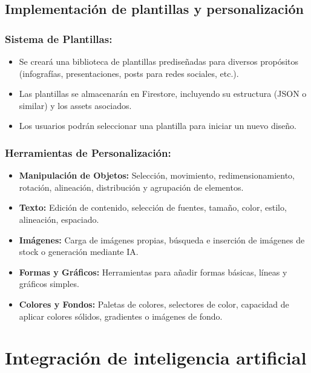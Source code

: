 \documentclass[12pt,a4paper]{report}
\begin{document}
\subsection{Implementación de plantillas y personalización}

\subsubsection{Sistema de Plantillas:}

\begin{itemize}
\item Se creará una biblioteca de plantillas prediseñadas para diversos propósitos (infografías, presentaciones, posts para redes sociales, etc.).
\item Las plantillas se almacenarán en Firestore, incluyendo su estructura (JSON o similar) y los assets asociados.
\item Los usuarios podrán seleccionar una plantilla para iniciar un nuevo diseño.
\end{itemize}

\subsubsection{Herramientas de Personalización:}

\begin{itemize}
\item \textbf{Manipulación de Objetos:} Selección, movimiento, redimensionamiento, rotación, alineación, distribución y agrupación de elementos.

\item \textbf{Texto:} Edición de contenido, selección de fuentes, tamaño, color, estilo, alineación, espaciado.

\item \textbf{Imágenes:} Carga de imágenes propias, búsqueda e inserción de imágenes de stock o generación mediante IA.

\item \textbf{Formas y Gráficos:} Herramientas para añadir formas básicas, líneas y gráficos simples.

\item \textbf{Colores y Fondos:} Paletas de colores, selectores de color, capacidad de aplicar colores sólidos, gradientes o imágenes de fondo.
\end{itemize}

\section{Integración de inteligencia artificial}
\end{document}

